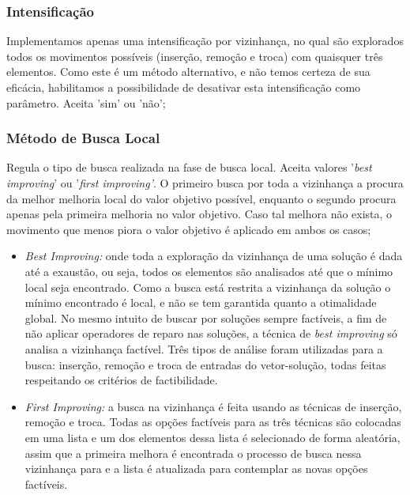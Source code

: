 \documentclass[12pt,a4paper]{article}
\begin{document}
    \subsubsection{Intensificação}

        Implementamos apenas uma intensificação por vizinhança, no qual são explorados todos os movimentos possíveis (inserção, remoção e troca) com quaisquer três elementos. Como
        este é um método alternativo, e não temos certeza de sua eficácia, habilitamos a possibilidade de desativar esta intensificação como parâmetro. Aceita 'sim' ou 'não';

    \subsubsection{Método de Busca Local}

        Regula o tipo de busca realizada na fase de busca local. Aceita valores '\textit{best improving}' ou '\textit{first improving'}. O primeiro busca por toda a vizinhança
        a procura da melhor melhoria local do valor objetivo possível, enquanto o segundo procura apenas pela primeira melhoria no valor objetivo. Caso tal melhora não exista, o movimento que menos
        piora o valor objetivo é aplicado em ambos os casos;

        \begin{itemize}

        \item {\it Best Improving:} onde toda a exploração da vizinhança de uma solução é dada até a exaustão, ou seja, todos os elementos são analisados até que o mínimo local seja encontrado. Como
            a busca está restrita a vizinhança da solução o mínimo encontrado é local, e não se tem garantida quanto a otimalidade global. No mesmo intuito de buscar por soluções sempre factíveis, a
                fim de não aplicar operadores de reparo nas soluções, a técnica de {\it best improving} só analisa a vizinhança factível. Três tipos de análise foram utilizadas para a busca:
                inserção, remoção e troca de entradas do vetor-solução, todas feitas respeitando os critérios de factibilidade. 

        \item {\it First Improving:} a busca na vizinhança é feita usando as técnicas de inserção, remoção e troca. Todas as opções factíveis para as três técnicas são colocadas em uma lista
        e um dos elementos dessa lista é selecionado de forma aleatória, assim que a primeira melhora é encontrada o processo de busca nessa vizinhança para e a lista é atualizada para
        contemplar as novas opções factíveis. 
        \end{itemize}
\end{document}
